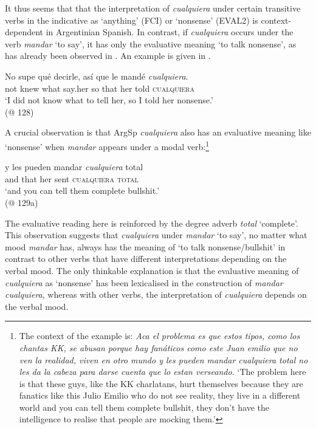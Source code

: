 \largerpage
It thus seems that that the interpretation of \textit{cualquiera} under certain transitive verbs in the indicative as ‘anything’ (FCI) or ‘nonsense’ (EVAL2) is context-dependent in Argentinian Spanish. In contrast, if \textit{cualquiera} occurs under the verb \textit{mandar} ‘to say’, it has only the evaluative meaning ‘to talk nonsense’, as has already been observed in . An example is given in .

\ea \label{bkm:Ref150786556} %
\gll No supe qué decirle, así que le mandé \textit{cualquiera}.\\
not knew what say.her so that her told \textsc{cualquiera}\\
\glt ‘I did not know what to tell her, so I told her nonsense.’\\
    (@ 128)
\z

A crucial observation is that ArgSp \textit{cualquiera} also has an evaluative meaning like ‘nonsense’ when \textit{mandar} appears under a modal verb:\footnote{The context of the example is: \textit{Aca el problema es que estos tipos, como los chantas KK, se abusan porque hay fanáticos como este Juan emilio que no ven la realidad, viven en otro mundo y les pueden mandar cualquiera total no les da la cabeza para darse cuenta que lo estan verseando.}
‘The problem here is that these guys, like the KK charlatans, hurt themselves because they are fanatics like this Julio Emilio who do not see reality, they live in a different world and you can tell them complete bullshit, they don’t have the intelligence to realise that people are mocking them.’}

\ea \label{ex:key:216} %
    \gll y les pueden mandar \textit{cualquiera} total\\
    and that her sent \textsc{cualquiera} \textsc{total}\\
    \glt ‘and you can tell them complete bullshit.’\\
    (@ 129a)
\z

The evaluative reading here is reinforced by the degree adverb \textit{total} ‘complete’. This observation suggests that \textit{cualquiera} under \textit{mandar} ‘to say’, no matter what mood \textit{mandar} has, always has the meaning of ‘to talk nonsense/bullshit’ in contrast to other verbs that have different interpretations depending on the verbal mood. The only thinkable explanation is that the evaluative meaning of \textit{cualquiera} as ‘nonsense’ has been lexicalised in the construction of \textit{mandar cualquiera}, whereas with other verbs, the interpretation of \textit{cualquiera} depends on the verbal mood.

